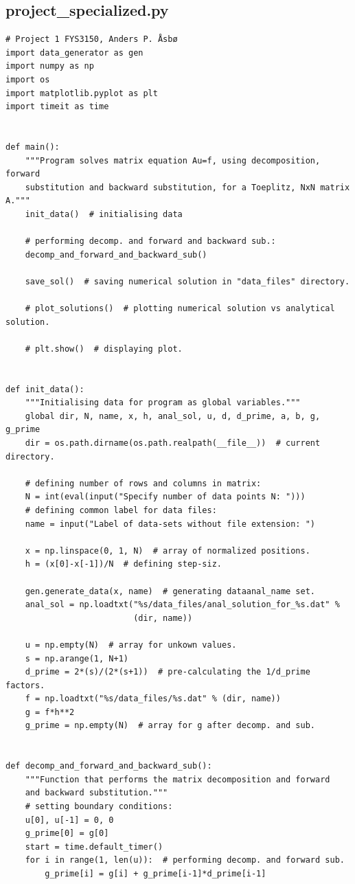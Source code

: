 \documentclass[english,notitlepage]{revtex4-1}  %
\begin{document}
\subsection{project\_specialized.py}\label{A:2}
\begin{lstlisting}
# Project 1 FYS3150, Anders P. Åsbø
import data_generator as gen
import numpy as np
import os
import matplotlib.pyplot as plt
import timeit as time


def main():
    """Program solves matrix equation Au=f, using decomposition, forward
    substitution and backward substitution, for a Toeplitz, NxN matrix A."""
    init_data()  # initialising data

    # performing decomp. and forward and backward sub.:
    decomp_and_forward_and_backward_sub()

    save_sol()  # saving numerical solution in "data_files" directory.

    # plot_solutions()  # plotting numerical solution vs analytical solution.

    # plt.show()  # displaying plot.


def init_data():
    """Initialising data for program as global variables."""
    global dir, N, name, x, h, anal_sol, u, d, d_prime, a, b, g, g_prime
    dir = os.path.dirname(os.path.realpath(__file__))  # current directory.

    # defining number of rows and columns in matrix:
    N = int(eval(input("Specify number of data points N: ")))
    # defining common label for data files:
    name = input("Label of data-sets without file extension: ")

    x = np.linspace(0, 1, N)  # array of normalized positions.
    h = (x[0]-x[-1])/N  # defining step-siz.

    gen.generate_data(x, name)  # generating dataanal_name set.
    anal_sol = np.loadtxt("%s/data_files/anal_solution_for_%s.dat" %
                          (dir, name))

    u = np.empty(N)  # array for unkown values.
    s = np.arange(1, N+1)
    d_prime = 2*(s)/(2*(s+1))  # pre-calculating the 1/d_prime factors.
    f = np.loadtxt("%s/data_files/%s.dat" % (dir, name))
    g = f*h**2
    g_prime = np.empty(N)  # array for g after decomp. and sub.


def decomp_and_forward_and_backward_sub():
    """Function that performs the matrix decomposition and forward
    and backward substitution."""
    # setting boundary conditions:
    u[0], u[-1] = 0, 0
    g_prime[0] = g[0]
    start = time.default_timer()
    for i in range(1, len(u)):  # performing decomp. and forward sub.
        g_prime[i] = g[i] + g_prime[i-1]*d_prime[i-1]


\end{lstlisting}
\end{document}
